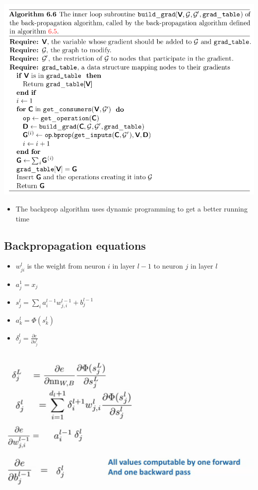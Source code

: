 \documentclass[11pt]{article}
\begin{document}
\begin{center}
\includegraphics[width=.9\linewidth]{Deep Feedforward Networks/screenshot_2018-10-02_09-04-43.png}
\end{center}

\begin{itemize}
\item The backprop algorithm uses dynamic programming to get a better running time
\end{itemize}

\subsection{Backpropagation equations}
\label{sec:orgfe6d5ad}
\begin{itemize}
\item \(w_{ji}^l\) is the weight from neuron \(i\) in layer \(l-1\) to neuron \(j\) in layer \(l\)
\item \(a_j^1 = x_j\)
\item \(s_j^l=\sum_ia_i^{l-1}w_{j,i}^{l-1}+b_j^{l-1}\)
\item \(a_k^l = \Phi(s_k^l)\)
\item \(\delta_j^l=\frac{\partial e}{\partial s_j^l}\)
\end{itemize}

\begin{center}
\includegraphics[width=.9\linewidth]{Deep Feedforward Networks/Screenshot-20181009083230-1068x588_2018-10-09_08-33-23.png}
\end{center}
\end{document}
